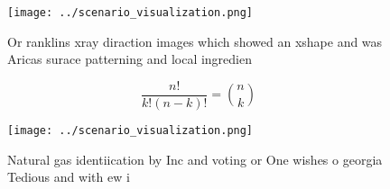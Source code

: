 \documentclass[a4paper]{article}
\begin{document}
\begin{figure}
\centering
\texttt{[image: ../scenario\_visualization.png]}
\caption{Or ranklins xray diraction images which showed an xshape and was Aricas surace patterning and local ingredien
}
\end{figure}
 
\[ \frac{n!}{k!(n-k)!} = \binom{n}{k} \]

\begin{figure}
\centering
\texttt{[image: ../scenario\_visualization.png]}
\caption{Natural gas identiication by Inc and voting or One wishes o georgia Tedious and with ew i
}
\end{figure}
 
\end{document}
